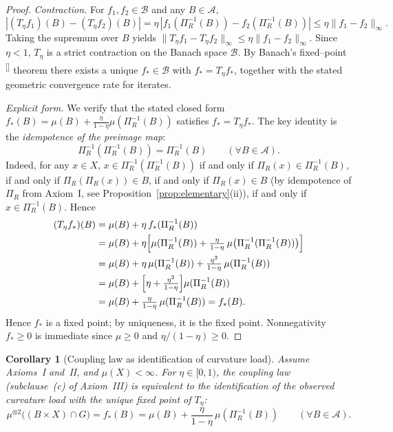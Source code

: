 \documentclass[11pt]{article}
\newcounter{ReviewerNoteCount}
\newcommand{\reviewer}[2]{%
    \stepcounter{ReviewerNoteCount}%
    {\color{blue}#1}%
    \textsuperscript{\color{blue}[\theReviewerNoteCount]}%
    \marginpar{\linespread{1.1}\selectfont\color{red}\scriptsize\raggedright\textbf{[\theReviewerNoteCount]} #2}%
}
\numberwithin{equation}{section}
\newtheorem{corollary}[theorem]{Corollary}
\theoremstyle{definition}
\begin{document}
\begin{proof}
\emph{Contraction.} For $f_1,f_2\in\mathcal B$ and any $B\in\mathcal A$,
\[
|(T_\eta f_1)(B)-(T_\eta f_2)(B)|=\eta\,|f_1(\Pi_R^{-1}(B))-f_2(\Pi_R^{-1}(B))|\le\eta\|f_1-f_2\|_\infty.
\]
Taking the supremum over $B$ yields $\|T_\eta f_1-T_\eta f_2\|_\infty\le\eta\|f_1-f_2\|_\infty$. Since $\eta<1$, $T_\eta$ is a strict contraction on the Banach space $\mathcal B$. By Banach's \reviewer{fixed--point}{fixed-point} theorem there exists a unique $f_*\in\mathcal B$ with $f_*=T_\eta f_*$, together with the stated geometric convergence rate for iterates.

\emph{Explicit form.} We verify that the stated closed form $f_*(B)=\mu(B)+\tfrac{\eta}{1-\eta}\mu(\Pi_R^{-1}(B))$ satisfies $f_*=T_\eta f_*$. The key identity is the \emph{idempotence of the preimage map}:
\[
\Pi_R^{-1}(\Pi_R^{-1}(B))=\Pi_R^{-1}(B)\qquad(\forall B\in\mathcal A).
\]
Indeed, for any $x\in X$, $x\in\Pi_R^{-1}(\Pi_R^{-1}(B))$ if and only if $\Pi_R(x)\in\Pi_R^{-1}(B)$, if and only if $\Pi_R(\Pi_R(x))\in B$, if and only if $\Pi_R(x)\in B$ (by idempotence of $\Pi_R$ from Axiom~I, see Proposition~\ref{prop:elementary}(ii)), if and only if $x\in\Pi_R^{-1}(B)$. Hence
\begin{align*}
(T_\eta f_*)(B)
&=\mu(B)+\eta\,f_*(\Pi_R^{-1}(B))\\
&=\mu(B)+\eta\Bigl[\mu(\Pi_R^{-1}(B))+\tfrac{\eta}{1-\eta}\,\mu\bigl(\Pi_R^{-1}(\Pi_R^{-1}(B))\bigr)\Bigr]\\
&=\mu(B)+\eta\,\mu(\Pi_R^{-1}(B))+\tfrac{\eta^2}{1-\eta}\,\mu(\Pi_R^{-1}(B))\\
&=\mu(B)+\Bigl[\eta+\tfrac{\eta^2}{1-\eta}\Bigr]\mu(\Pi_R^{-1}(B))\\
&=\mu(B)+\tfrac{\eta}{1-\eta}\,\mu(\Pi_R^{-1}(B))=f_*(B).
\end{align*}
Hence $f_*$ is a fixed point; by uniqueness, it is the fixed point. Nonnegativity $f_*\ge 0$ is immediate since $\mu\ge 0$ and $\eta/(1-\eta)\ge 0$.
\end{proof}

\begin{corollary}[Coupling law as identification of curvature load]\label{cor:coupling-identification}
Assume Axioms~I and~II, and $\mu(X)<\infty$. For $\eta\in[0,1)$, the coupling law (subclause~(c) of Axiom~III) is equivalent to the identification of the observed curvature load with the unique fixed point of $T_\eta$:
\[
\mu^{\otimes2}\bigl((B\times X)\cap G\bigr)=f_*(B)=\mu(B)+\frac{\eta}{1-\eta}\,\mu(\Pi_R^{-1}(B))
\qquad(\forall B\in\mathcal A).
\]
\end{corollary}
\end{document}
